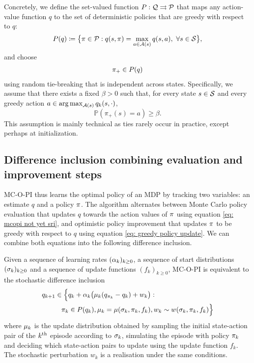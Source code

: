 Concretely, we define the set-valued function $P : \mathcal{Q} \rightrightarrows \mathcal{P}$ that maps any action-value function $q$ to the set of deterministic policies that are greedy with respect to $q$:
\begin{align}
\label{eq: greedy pol}
    P(q) \coloneqq \big\{ \pi \in \mathcal{P} : q(s, \pi) = \max_{a \in \mathcal{A}(s)} q(s,a), \ \forall s \in \mathcal{S} \big\} ,
\end{align}
and choose
\begin{align}
\label{eq: greedy policy update}
    \pi_+ \in P(q)
\end{align}
using random tie-breaking that is independent across states. Specifically, we assume that there exists a fixed $\beta>0$ such that, for every state $s \in \mathcal{S}$ and every greedy action $a \in \arg\max_{\mathcal{A}(s)} q_k(s,\cdot)$,
\begin{equation}
\label{eq:greedy-pol-tie-breaking}
    \mathbb P(\pi_+(s) = a ) \ge \beta.
\end{equation}
This assumption is mainly technical as ties rarely occur in practice, except perhaps at initialization.


\subsection{Difference inclusion combining evaluation and improvement steps}

MC-O-PI thus learns the optimal policy of an MDP by tracking two variables: an estimate $q$ and a policy $\pi$. The algorithm alternates between 
Monte Carlo policy evaluation that updates $q$ towards the action values of $\pi$ using equation \eqref{eq: mcopi not yet sri}, and optimistic policy improvement that updates $\pi$ to be greedy with respect to $q$ using equation \eqref{eq: greedy policy update}.
We can combine both equations into the following difference inclusion.

\begin{definition}
\label{def: mcopi}
Given a sequence of learning rates $(\alpha_k)_{k \geq 0}$, a sequence of start distributions $(\sigma_k)_{k \geq 0}$ and a sequence of update functions $(f_k)_{k \geq 0}$,
MC-O-PI is equivalent to the stochastic difference inclusion
\begin{align}
\nonumber
    &q_{k+1}
    \in
    \Big\{ 
    q_k + \alpha_k \bigl( \mu_k ( q_{\pi_k} - q_k ) + w_k \bigr) 
    :
    \\
\label{eq: complete difference inclusion}
    &\hspace{1cm}
    \pi_k \in P(q_k),
    \mu_k = \mu(\sigma_k, \pi_k, f_k),
    w_k \sim w(\sigma_k, \pi_k, f_k)
    \Big\}
\end{align}
where $\mu_k$ is the update distribution obtained by sampling the initial state-action pair of the $k^{\textup{th}}$ episode according to $\sigma_k$, simulating the episode with policy $\pi_k$ and deciding which state-action pairs to update using the update function $f_k$.
The stochastic perturbation $w_k$ is a realisation under the same conditions.
\end{definition}

